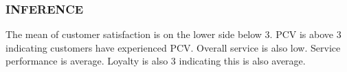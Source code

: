 \documentclass[a4paper, 12pt]{extarticle}
\begin{document}
{\subsubsection{INFERENCE}
The mean of customer satisfaction is on the lower side below 3.  PCV is above 3 indicating customers have experienced PCV. Overall service is also low. Service performance is average. Loyalty is also 3 indicating this is also average.
}
\end{document}
